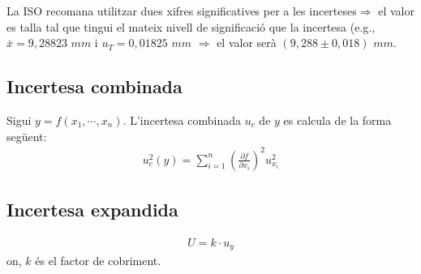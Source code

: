 La ISO recomana utilitzar dues xifres significatives per a les incerteses$\Rightarrow$ el valor es talla tal que tingui el mateix nivell de significació que la incertesa (e.g., $\bar{x} = 9,28823$ $mm$ i $u_{T} = 0,01825$ $mm$ $\Rightarrow$ el valor serà $\left( 9,288 \pm 0,018 \right)$ $mm$.

\subsection{Incertesa combinada}
Sigui $y = f(x_{1} , \cdots , x_{n})$. L'incertesa combinada $u_{c}$ de $y$ es calcula de la forma següent:
\begin{align}
    \boxed{u_{c}^{2} \left( y \right) = \sum\limits_{i=1}^{n} \left( \frac{\partial f}{\partial x_{i}} \right) ^{2} u_{x_{i}}^{2}}
\end{align}

\subsection{Incertesa expandida}
\begin{align}
    \boxed{U = k \cdot u_{y}}
\end{align}
on, $k$ és el factor de cobriment.